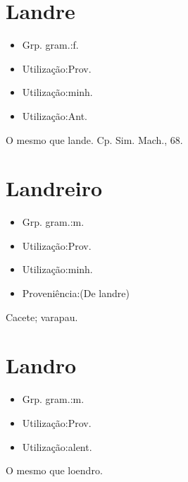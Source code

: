 \section{Landre}
\begin{itemize}
\item {Grp. gram.:f.}
\end{itemize}
\begin{itemize}
\item {Utilização:Prov.}
\end{itemize}
\begin{itemize}
\item {Utilização:minh.}
\end{itemize}
\begin{itemize}
\item {Utilização:Ant.}
\end{itemize}
O mesmo que \textunderscore lande\textunderscore . Cp. Sim. Mach., 68.
\section{Landreiro}
\begin{itemize}
\item {Grp. gram.:m.}
\end{itemize}
\begin{itemize}
\item {Utilização:Prov.}
\end{itemize}
\begin{itemize}
\item {Utilização:minh.}
\end{itemize}
\begin{itemize}
\item {Proveniência:(De \textunderscore landre\textunderscore )}
\end{itemize}
Cacete; varapau.
\section{Landro}
\begin{itemize}
\item {Grp. gram.:m.}
\end{itemize}
\begin{itemize}
\item {Utilização:Prov.}
\end{itemize}
\begin{itemize}
\item {Utilização:alent.}
\end{itemize}
O mesmo que \textunderscore loendro\textunderscore .
